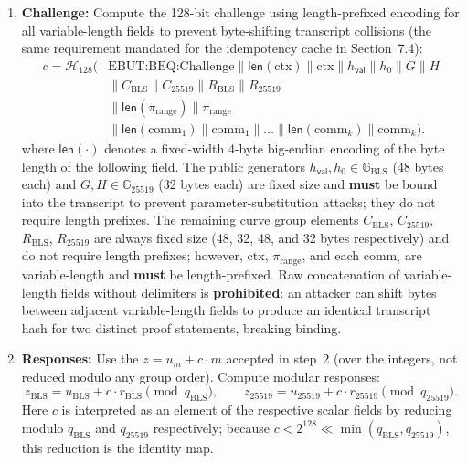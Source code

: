 \documentclass[11pt]{article}
\theoremstyle{definitionstyle}
\theoremstyle{plain}
\begin{document}
\begin{enumerate}[leftmargin=*]
\item \textbf{Challenge:}
  Compute the 128-bit challenge using length-prefixed encoding for all variable-length fields to prevent byte-shifting transcript collisions (the same requirement mandated for the idempotency cache in Section~7.4):
  \[
  \begin{aligned}
  c = \mathcal{H}_{128}\!\bigl(&\text{EBUT:BEQ:Challenge} \parallel \mathsf{len}(\text{ctx}) \parallel \text{ctx} \parallel h_{\mathsf{val}} \parallel h_0 \parallel G \parallel H \\
  &\parallel C_{\text{BLS}} \parallel C_{25519} \parallel R_{\text{BLS}} \parallel R_{25519} \\
  &\parallel \mathsf{len}(\pi_{\text{range}}) \parallel \pi_{\text{range}} \\
  &\parallel \mathsf{len}(\text{comm}_1) \parallel \text{comm}_1 \parallel \dots \parallel \mathsf{len}(\text{comm}_k) \parallel \text{comm}_k\bigr).
  \end{aligned}
  \]
  where $\mathsf{len}(\cdot)$ denotes a fixed-width 4-byte big-endian encoding of the byte length of the following field. The public generators $h_{\mathsf{val}}, h_0 \in \mathbb{G}_{\text{BLS}}$ (48 bytes each) and $G, H \in \mathbb{G}_{25519}$ (32 bytes each) are fixed size and \textbf{must} be bound into the transcript to prevent parameter-substitution attacks; they do not require length prefixes. The remaining curve group elements $C_{\text{BLS}}$, $C_{25519}$, $R_{\text{BLS}}$, $R_{25519}$ are always fixed size (48, 32, 48, and 32 bytes respectively) and do not require length prefixes; however, $\text{ctx}$, $\pi_{\text{range}}$, and each $\text{comm}_i$ are variable-length and \textbf{must} be length-prefixed. Raw concatenation of variable-length fields without delimiters is \textbf{prohibited}: an attacker can shift bytes between adjacent variable-length fields to produce an identical transcript hash for two distinct proof statements, breaking binding.

\item \textbf{Responses:}
  Use the $z = u_m + c \cdot m$ accepted in step~2 (over the integers, not reduced modulo any group order).
  Compute modular responses:
  \[
  z_{\text{BLS}} = u_{\text{BLS}} + c \cdot r_{\text{BLS}} \pmod{q_{\text{BLS}}}, \qquad
  z_{25519} = u_{25519} + c \cdot r_{25519} \pmod{q_{25519}}.
  \]
  Here $c$ is interpreted as an element of the respective scalar fields by reducing modulo $q_{\text{BLS}}$ and $q_{25519}$ respectively; because $c < 2^{128} \ll \min(q_{\text{BLS}}, q_{25519})$, this reduction is the identity map.


\end{enumerate}
\end{document}
